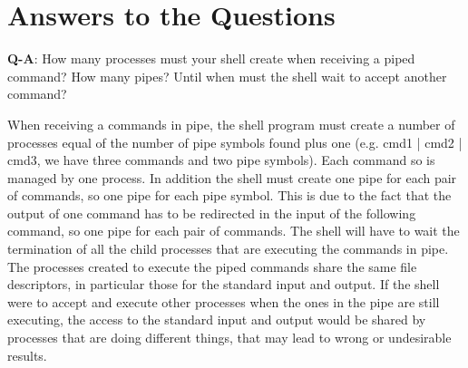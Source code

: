 





\maketitle

%
%
%
%
%



\section{Answers to the Questions}
\textbf{Q-A}: How many processes must your shell create when receiving a piped command? How many pipes? Until when must the shell wait to accept another command? \newline

When receiving a commands in pipe, the shell program must create a number of processes equal of the number of pipe symbols found plus one (e.g. cmd1 | cmd2 | cmd3, we have three commands and two pipe symbols). Each command so is managed by one process. \newline
In addition the shell must create one pipe for each pair of commands, so one pipe for each pipe symbol. This is due to the fact that the output of one command has to be redirected in the input of the following command, so one pipe for each pair of commands.\newline
The shell will have to wait the termination of all the child processes that are executing the commands in pipe. 
The processes created to execute the piped commands share the same file descriptors, in particular those for the standard input and output. If the shell were to accept and execute other processes when the ones in the pipe are still executing, the access to the standard input and output would be shared by processes that are doing different things, that may lead to wrong or undesirable results. \newline

